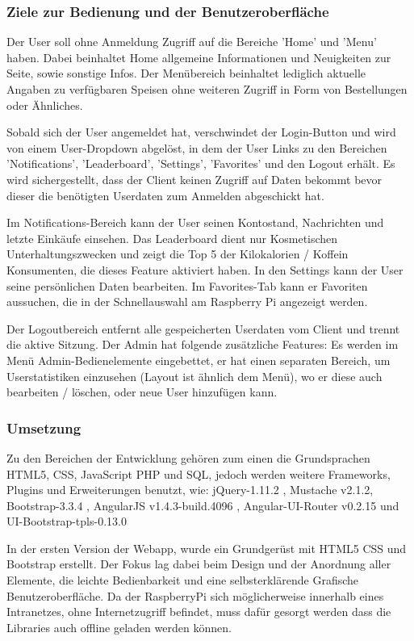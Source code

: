 \documentclass[11pt,a4paper]{article} %
\begin{document}
\subsubsection{Ziele zur Bedienung und der Benutzeroberfläche}

Der User soll ohne Anmeldung Zugriff auf die Bereiche 'Home' und 'Menu' haben. Dabei beinhaltet Home allgemeine Informationen und Neuigkeiten zur Seite, sowie sonstige Infos. Der Menübereich beinhaltet lediglich aktuelle Angaben zu verfügbaren Speisen ohne weiteren Zugriff in Form von Bestellungen oder Ähnliches. 
\par
Sobald sich der User angemeldet hat, verschwindet der Login-Button und wird von einem User-Dropdown abgelöst, in dem der User Links zu den Bereichen 'Notifications', 'Leaderboard', 'Settings', 'Favorites' und den Logout erhält.  Es wird sichergestellt, dass der Client keinen Zugriff auf Daten bekommt bevor dieser die benötigten Userdaten zum Anmelden abgeschickt hat. 
\par
Im Notifications-Bereich kann der User seinen Kontostand, Nachrichten und letzte Einkäufe einsehen. Das Leaderboard dient nur Kosmetischen Unterhaltungszwecken und zeigt die Top 5 der Kilokalorien / Koffein Konsumenten, die dieses Feature aktiviert haben. In den Settings kann der User seine persönlichen Daten bearbeiten. Im Favorites-Tab kann er Favoriten aussuchen, die in der Schnellauswahl am Raspberry Pi angezeigt werden. 

Der Logoutbereich entfernt alle gespeicherten Userdaten vom Client und trennt die aktive Sitzung. Der Admin hat folgende zusätzliche Features: Es werden im Menü Admin-Bedienelemente eingebettet, er hat einen separaten Bereich, um Userstatistiken einzusehen (Layout ist ähnlich dem Menü), wo er diese auch bearbeiten / löschen, oder neue User hinzufügen kann. 


\subsubsection{Umsetzung}
\par
Zu den Bereichen der Entwicklung gehören zum einen die Grundsprachen HTML5, CSS, JavaScript PHP und SQL,\cite{22}  jedoch werden weitere Frameworks, Plugins und Erweiterungen benutzt, wie: jQuery-1.11.2 \cite{18}, Mustache v2.1.2, Bootstrap-3.3.4 \cite{17}, AngularJS v1.4.3-build.4096 \cite{16}, Angular-UI-Router v0.2.15  und UI-Bootstrap-tpls-0.13.0
\cite{19}
\par
In der ersten Version der Webapp, wurde ein Grundgerüst mit HTML5 CSS und Bootstrap erstellt. Der Fokus lag dabei beim Design und der Anordnung aller Elemente, die leichte Bedienbarkeit und eine selbsterklärende Grafische Benutzeroberfläche. Da der RaspberryPi sich möglicherweise innerhalb eines Intranetzes, ohne Internetzugriff befindet, muss dafür gesorgt werden dass die Libraries auch offline geladen werden können.
\end{document}
